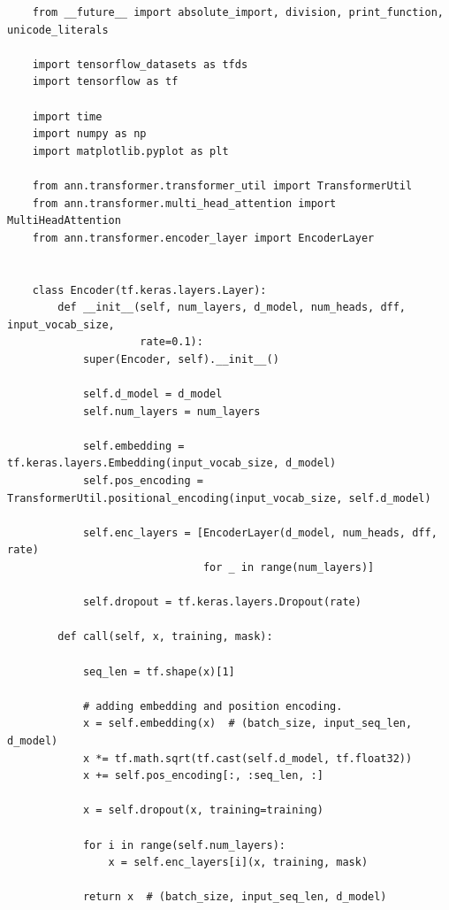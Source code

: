\documentclass{article}
\begin{document}
\begin{lstlisting}
    from __future__ import absolute_import, division, print_function, unicode_literals

    import tensorflow_datasets as tfds
    import tensorflow as tf
    
    import time
    import numpy as np
    import matplotlib.pyplot as plt
    
    from ann.transformer.transformer_util import TransformerUtil
    from ann.transformer.multi_head_attention import MultiHeadAttention
    from ann.transformer.encoder_layer import EncoderLayer
    
    
    class Encoder(tf.keras.layers.Layer):
        def __init__(self, num_layers, d_model, num_heads, dff, input_vocab_size,
                     rate=0.1):
            super(Encoder, self).__init__()
    
            self.d_model = d_model
            self.num_layers = num_layers
    
            self.embedding = tf.keras.layers.Embedding(input_vocab_size, d_model)
            self.pos_encoding = TransformerUtil.positional_encoding(input_vocab_size, self.d_model)
    
            self.enc_layers = [EncoderLayer(d_model, num_heads, dff, rate)
                               for _ in range(num_layers)]
    
            self.dropout = tf.keras.layers.Dropout(rate)
    
        def call(self, x, training, mask):
    
            seq_len = tf.shape(x)[1]
    
            # adding embedding and position encoding.
            x = self.embedding(x)  # (batch_size, input_seq_len, d_model)
            x *= tf.math.sqrt(tf.cast(self.d_model, tf.float32))
            x += self.pos_encoding[:, :seq_len, :]
    
            x = self.dropout(x, training=training)
    
            for i in range(self.num_layers):
                x = self.enc_layers[i](x, training, mask)
    
            return x  # (batch_size, input_seq_len, d_model)    
\end{lstlisting}
\end{document}
